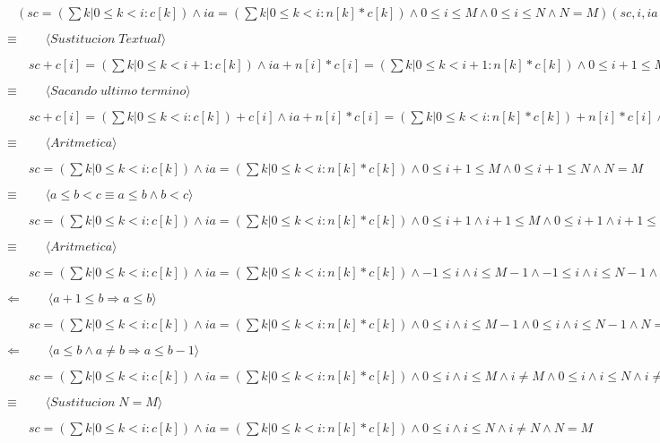 \documentclass{article}
\begin{document}
$\quad (sc=(\sum k|0 \leq k < i: c[k]) \land ia=(\sum k|0 \leq k < i: n[k]*c[k]) \land 0 \leq i \leq M \land 0 \leq i \leq N \land N=M)(sc, i, ia := c[i]+sc, i + 1, ia+n[i]*c[i])$\par 
$\equiv  \qquad \langle Sustitucion \; Textual \rangle$ \par 
$\qquad sc + c[i]=(\sum k|0 \leq k < i+1: c[k]) \land ia+n[i]*c[i]=(\sum k|0 \leq k < i+1: n[k]*c[k]) \land 0 \leq i+1 \leq M \land 0 \leq i+1 \leq N  \land N=M$ \par
$\equiv  \qquad \langle Sacando \; ultimo \; termino \rangle$ \par 
$\qquad sc + c[i]=(\sum k|0 \leq k < i: c[k])+c[i] \land ia+n[i]*c[i]=(\sum k|0 \leq k < i: n[k]*c[k])+n[i]*c[i] \land 0 \leq i+1 \leq M \land 0 \leq i+1 \leq N  \land N=M$ \par
$\equiv  \qquad \langle Aritmetica \rangle$ \par 
$\qquad sc=(\sum k|0 \leq k < i: c[k]) \land ia=(\sum k|0 \leq k < i: n[k]*c[k]) \land 0 \leq i+1 \leq M \land 0 \leq i+1 \leq N  \land N=M$ \par
$\equiv  \qquad \langle a \leq b <c \equiv a \leq b \land b < c \rangle$ \par 
$\qquad sc=(\sum k|0 \leq k < i: c[k]) \land ia=(\sum k|0 \leq k < i: n[k]*c[k]) \land 0 \leq i+1 \land i+1 \leq M \land 0 \leq i+1 \land i+1 \leq N  \land N=M$ \par 
$\equiv  \qquad \langle Aritmetica \rangle$ \par 
$\qquad sc=(\sum k|0 \leq k < i: c[k]) \land ia=(\sum k|0 \leq k < i: n[k]*c[k]) \land -1 \leq i \land i \leq M-1 \land -1 \leq i \land i \leq N-1  \land N=M$ \par
$\Leftarrow  \qquad \langle a+1 \leq b \Rightarrow a \leq b \rangle$ \par 
$\qquad sc=(\sum k|0 \leq k < i: c[k]) \land ia=(\sum k|0 \leq k < i: n[k]*c[k]) \land 0 \leq i \land i \leq M-1 \land 0 \leq i \land i \leq N-1  \land N=M$ \par 
$\Leftarrow  \qquad \langle a \leq b \land a \neq b \Rightarrow a \leq b-1 \rangle$ \par 
$\qquad sc=(\sum k|0 \leq k < i: c[k]) \land ia=(\sum k|0 \leq k < i: n[k]*c[k]) \land 0 \leq i \land i \leq M \land i \neq M \land 0 \leq i \land i \leq N \land i \neq N  \land N=M$ \par 
$\equiv  \qquad \langle Sustitucion \; N=M \rangle$ \par 
$\qquad sc=(\sum k|0 \leq k < i: c[k]) \land ia=(\sum k|0 \leq k < i: n[k]*c[k]) \land 0 \leq i \land i \leq N \land i \neq N  \land N=M$ \par 
\end{document}
